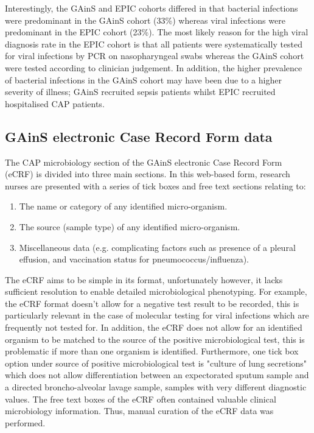 Interestingly, the GAinS and EPIC cohorts differed in that bacterial infections were predominant in the GAinS cohort (33\%) whereas viral infections were predominant in the EPIC cohort (23\%). The most likely reason for the high viral diagnosis rate in the EPIC cohort is that all patients were systematically tested for viral infections by PCR on nasopharyngeal swabs whereas the GAinS cohort were tested according to clinician judgement. In addition, the higher prevalence of bacterial infections in the GAinS cohort may have been due to a higher severity of illness; GAinS recruited sepsis patients whilst EPIC recruited hospitalised CAP patients.

\subsection{GAinS electronic Case Record Form data}
The CAP microbiology section of the GAinS electronic Case Record Form (eCRF) is divided into three main sections. In this web-based form, research nurses are presented with a series of tick boxes and free text sections relating to:
\begin{enumerate}
	\item The name or category of any identified micro-organism.
	\item The source (sample type) of any identified micro-organism.
	\item Miscellaneous data (e.g. complicating factors such as presence of a pleural effusion, and vaccination status for pneumococcus/influenza).
\end{enumerate}

The eCRF aims to be simple in its format, unfortunately however, it lacks sufficient resolution to enable detailed microbiological phenotyping. For example, the eCRF format doesn't allow for a negative test result to be recorded, this is particularly relevant in the case of molecular testing for viral infections which are frequently not tested for. In addition, the eCRF does not allow for an identified organism to be matched to the source of the positive microbiological test, this is problematic if more than one organism is identified. Furthermore, one tick box option under source of positive microbiological test is "culture of lung secretions" which does not allow differentiation between an expectorated sputum sample and a directed broncho-alveolar lavage sample, samples with very different diagnostic values. The free text boxes of the eCRF often contained valuable clinical microbiology information. Thus, manual curation of the eCRF data was performed.

